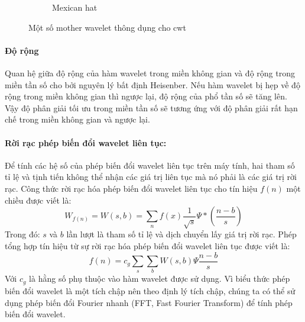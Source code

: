 \begin{figure} [ht]
\begin{subfigure}{0.3\textwidth}
		\caption{Mexican hat}
	\end{subfigure}
\caption{Một số mother wavelet thông dụng cho \ac{cwt}}
\end{figure}

\paragraph{Độ rộng}
Quan hệ giữa độ rộng của hàm wavelet trong miền không gian và độ rộng trong miền tần số cho bởi nguyên lý bất định Heisenber. Nếu hàm wavelet bị hẹp về độ rộng trong miền không gian thì ngược lại, độ rộng của phổ tần số sẽ tăng lên. Vậy độ phân giải tối ưu trong miền tần số sẽ tương ứng với độ phân giải rất hạn chế trong miền không gian và ngược lại.

\paragraph{Rời rạc phép biến đổi wavelet liên tục:}
Để tính các hệ số của phép biến đổi wavelet liên tục trên máy tính, hai tham số tỉ lệ và tịnh tiến không thể nhận các giá trị liên tục mà nó phải là các giá trị rời rạc. Công thức rời rạc hóa phép biến đổi wavelet liên tục cho tín hiệu $f(n)$ một chiều được viết là:
\begin{equation}
W_{f(n)} = W(s, b) = \sum_n f(x) \frac{1}{\sqrt{s}}\Psi*(\frac{n-b}{s})
\end{equation}
Trong đó: $s$ và $b$ lần lượt là tham số tỉ lệ và dịch chuyển lấy giá trị rời rạc. 
Phép tổng hợp tín hiệu từ sự rời rạc hóa phép biến đổi wavelet liên tục được viết là:
\begin{equation}
f(n) = c_g \sum_s \sum_b W(s, b)\Psi\frac{n-b}{s}
\end{equation}
Với $c_g$ là hằng số phụ thuộc vào hàm wavelet được sử dụng.
Vì biểu thức phép biến đổi wavelet là một tích chập nên theo định lý tích chập, chúng ta có thể sử dụng phép biến đổi Fourier nhanh (FFT, Fast Fourier Transform) để tính phép biến đổi wavelet.

































